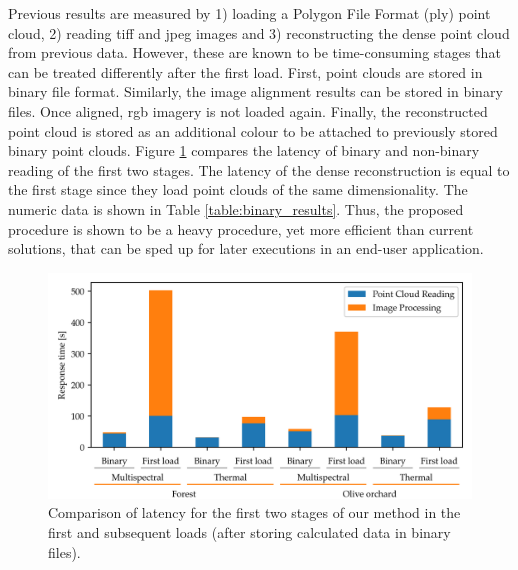 Previous results are measured by 1) loading a Polygon File Format (\acrshort{ply}) point cloud, 2) reading \acrshort{tiff} and \acrshort{jpeg} images and 3) reconstructing the dense point cloud from previous data. However, these are known to be time-consuming stages that can be treated differently after the first load. First, point clouds are stored in binary file format. Similarly, the image alignment results can be stored in binary files. Once aligned, \acrshort{rgb} imagery is not loaded again. Finally, the reconstructed point cloud is stored as an additional colour to be attached to previously stored binary point clouds. Figure \ref{fig:occlusion_binary_response_time} compares the latency of binary and non-binary reading of the first two stages. The latency of the dense reconstruction is equal to the first stage since they load point clouds of the same dimensionality. The numeric data is shown in Table \ref{table:binary_results}. Thus, the proposed procedure is shown to be a heavy procedure, yet more efficient than current solutions, that can be sped up for later executions in an end-user application.

\begin{figure}[ht]
    \centering
    \includegraphics[width=\linewidth]{figs/multi_thermal_projection/results/binary_response_time.png}
    \caption{Comparison of latency for the first two stages of our method in the first and subsequent loads (after storing calculated data in binary files).}
	\label{fig:occlusion_binary_response_time}
\end{figure}

